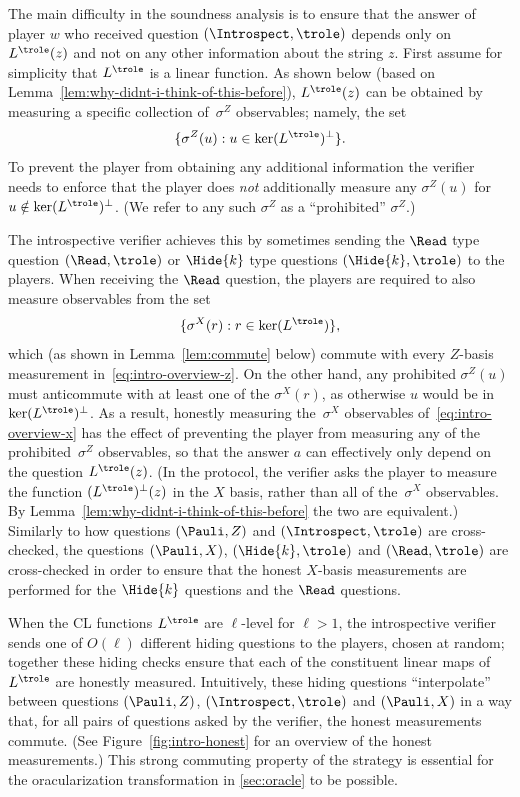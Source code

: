 The main difficulty in the soundness analysis is to ensure that the answer of
player $w$ who received question $(\Introspect, \trole)$ depends only on
$L^\trole(z)$ and not on any other information about the string $z$.
First assume for simplicity that $L^\trole$ is a linear function.
As shown below (based on Lemma~\ref{lem:why-didnt-i-think-of-this-before}),
$L^\trole(z)$ can be obtained by measuring a specific collection of~$\sigma^Z$
observables; namely, the set
\begin{equation}
  \label{eq:intro-overview-z}
  \{\sigma^Z(u) : u \in \ker(L^\trole)^\perp\}.
\end{equation}
To prevent the player from obtaining any additional information the verifier
needs to enforce that the player does \emph{not} additionally measure any
$\sigma^Z(u)$ for $u \notin \ker(L^\trole)^\perp$.
(We refer to any such $\sigma^Z$ as a ``prohibited'' $\sigma^Z$.)

The introspective verifier achieves this by sometimes sending the $\Read$ type
question $(\Read, \trole)$ or $\Hide{k}$ type questions $(\Hide{k}, \trole)$ to the
players.
When receiving the $\Read$ question, the players are required to also measure
observables from the set
\begin{equation}
  \label{eq:intro-overview-x}
  \{\sigma^X(r) : r \in \ker(L^\trole)\},
\end{equation}
which (as shown in Lemma~\ref{lem:commute} below) commute with every $Z$-basis
measurement in~\eqref{eq:intro-overview-z}.
On the other hand, any prohibited $\sigma^Z(u)$ must anticommute with at least
one of the $\sigma^X(r)$, as otherwise $u$ would be in $\ker(L^\trole)^\perp$.
As a result, honestly measuring the~$\sigma^X$ observables
of~\eqref{eq:intro-overview-x} has the effect of preventing the player from
measuring any of the prohibited~$\sigma^Z$ observables, so that the answer $a$
can effectively only depend on the question $L^\trole(z)$.
(In the protocol, the verifier asks the player to measure the function
$(L^\trole)^\perp(z)$ in the $X$ basis, rather than all of the~$\sigma^X$
observables.
By Lemma~\ref{lem:why-didnt-i-think-of-this-before} the two are equivalent.)
Similarly to how questions $(\Pauli, Z)$ and $(\Introspect, \trole)$ are
cross-checked, the questions $(\Pauli, X)$, $(\Hide{k}, \trole)$ and $(\Read,
\trole)$ are cross-checked in order to ensure that the honest $X$-basis
measurements are performed for the $\Hide{k}$ questions and the $\Read$ questions.

When the CL functions $L^\trole$ are $\ell$-level for $\ell > 1$, the
introspective verifier sends one of $O(\ell)$ different hiding questions to the
players, chosen at random; together these hiding checks ensure that each of the
constituent linear maps of $L^\trole$ are honestly measured.
Intuitively, these hiding questions ``interpolate'' between questions
$(\Pauli,Z)$, $(\Introspect,\trole)$ and $(\Pauli,X)$ in a way that, for all
pairs of questions asked by the verifier, the honest measurements commute.
(See Figure~\ref{fig:intro-honest} for an overview of the honest measurements.)
This strong commuting property of the strategy is essential for the
oracularization transformation in \cref{sec:oracle} to be possible.

